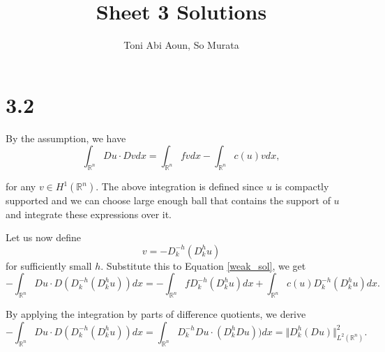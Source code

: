 \documentclass{article}
\title{Sheet 3 Solutions}
\author{Toni Abi Aoun, So Murata}
\date{}
\begin{document}
\maketitle

\section*{3.2}

By the assumption, we have
\begin{equation}
\label{weak_sol}
\int_{\mathbb{R}^n} Du\cdot Dv dx = \int_{\mathbb{R}^n} fvdx - \int_{\mathbb{R}^n}c(u)vdx,
\end{equation}

for any $v\in H^1(\mathbb{R}^n)$. The above integration is defined since $u$ is compactly supported and we can choose large enough ball that contains the support of $u$ and integrate these expressions over it.\\
\par Let us now define 
\begin{equation*}
v = -D_k^{-h}(D_k^hu)
\end{equation*}
for sufficiently small $h$. Substitute this to Equation \ref{weak_sol}, we get
\begin{equation*}
-\int_{\mathbb{R}^n} Du\cdot D(D_k^{-h}(D_k^hu))dx = -\int_{\mathbb{R}^n} fD_k^{-h}(D_k^h u)dx + \int_{\mathbb{R}^n}c(u)D_k^{-h}(D_k^hu)dx.
\end{equation*}

By applying the integration by parts of difference quotients, we derive
\begin{equation*}
-\int_{\mathbb{R}^n} Du\cdot D(D_k^{-h}(D_k^hu))dx = \int_{\mathbb{R}^n} D_k^{-h}Du\cdot (D_k^hDu))dx=\Vert D_k^h(Du)\Vert^2_{L^2(\mathbb{R}^n)}.
\end{equation*}
\end{document}
